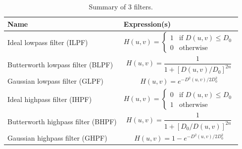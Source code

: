 \begin{table}[h]
	\caption{Summary of 3 filters.}
	\label{table:3filters}
	\centering
	\begin{tabular}{|l|m{}|}
	\hline
		Name & Expression(s) \\ \hline
		Ideal lowpass filter (ILPF) & 
		\begin{equation} H(u,v) = \left \{ \begin{array}{rcl}
								1 & \text{if $D(u,v)\leq D_0$} \\
								0 & \text{otherwise}  \end{array} \right.
 		\end{equation} \\ \hline
		Butterworth lowpass filter (BLPF) & \begin{equation} H(u,v)=\frac{1}{1+[D(u,v)/D_0]^{2n}} \end{equation} \\ \hline
		Gaussian lowpass filter (GLPF) & \begin{equation} H(u,v)=e^{-D^2(u,v)/2D_0^2} \end{equation} \\ 
	\hline
		Ideal highpass filter (IHPF) & 
		\begin{equation} H(u,v) = \left \{ \begin{array}{rcl}
								0 & \text{if $D(u,v)\leq D_0$} \\
								1 & \text{otherwise}  \end{array} \right.
 		\end{equation} \\ \hline
		Butterworth highpass filter (BHPF) & \begin{equation} H(u,v)=\frac{1}{1+[D_0/D(u,v)]^{2n}} \end{equation} \\ \hline
		Gaussian highpass filter (GHPF) & \begin{equation} H(u,v)=1-e^{-D^2(u,v)/2D_0^2} \end{equation} \\ 
	\hline
	\end{tabular}
\end{table}

